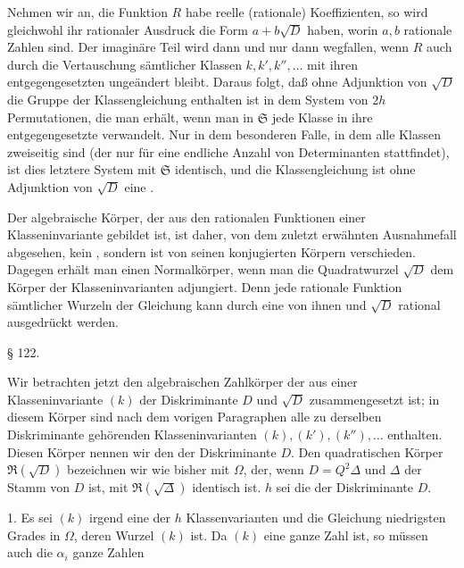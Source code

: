 

Nehmen wir an, die Funktion $R$ habe reelle (rationale) Koeffizienten, so wird gleichwohl ihr rationaler Ausdruck die Form $a+b\sqrt{D}$ haben, worin $a, b$ rationale Zahlen sind. Der imaginäre Teil wird dann und nur dann wegfallen, wenn $R$ auch durch die Vertauschung sämtlicher Klassen $k, k', k'', \ldots$ mit ihren entgegengesetzten ungeändert bleibt. Daraus folgt, daß ohne Adjunktion von $\sqrt{D}$ die  Gruppe der Klassengleichung enthalten ist in dem System von $2h$ Permutationen, die man erhält, wenn man in $\mathfrak{S}$ jede Klasse in ihre entgegengesetzte verwandelt. Nur in dem besonderen Falle, in dem alle Klassen zweiseitig sind (der nur für eine endliche Anzahl von Determinanten stattfindet), ist dies letztere System mit $\mathfrak{S}$ identisch, und die Klassengleichung ist ohne Adjunktion von $\sqrt{D}$ eine .

Der algebraische Körper, der aus den rationalen Funktionen einer Klasseninvariante gebildet ist, ist daher, von dem zuletzt erwähnten Ausnahmefall abgesehen, kein , sondern ist von seinen konjugierten Körpern verschieden. Dagegen erhält man einen Normalkörper, wenn man die Quadratwurzel $\sqrt{D}$ dem Körper der Klasseninvarianten adjungiert. Denn jede rationale Funktion sämtlicher Wurzeln der Gleichung kann durch eine von ihnen und $\sqrt{D}$ rational ausgedrückt werden.

\begin{center}
§ 122. 
\end{center}

Wir betrachten jetzt den algebraischen Zahlkörper
der aus einer Klasseninvariante $(k)$ der Diskriminante $D$ und $\sqrt{D}$ zusammengesetzt ist; in diesem Körper sind nach dem vorigen Paragraphen alle zu derselben Diskriminante gehörenden Klasseninvarianten $(k), (k'), (k''), \ldots$ enthalten. Diesen Körper nennen wir den  der Diskriminante $D$. Den quadratischen Körper $\mathfrak{R}(\sqrt{D})$ bezeichnen wir wie bisher mit $\Omega$, der, wenn $D=Q^2\Delta$ und $\Delta$ der Stamm von $D$ ist, mit $\mathfrak{R}(\sqrt{\Delta})$ identisch ist.
$h$ sei die  der Diskriminante $D$.

1. Es sei $(k)$ irgend eine der $h$ Klassenvarianten und %
die Gleichung niedrigsten Grades in $\Omega$, deren Wurzel $(k)$ ist. Da $(k)$ eine ganze Zahl ist, so müssen auch die $\alpha_i$ ganze Zahlen
